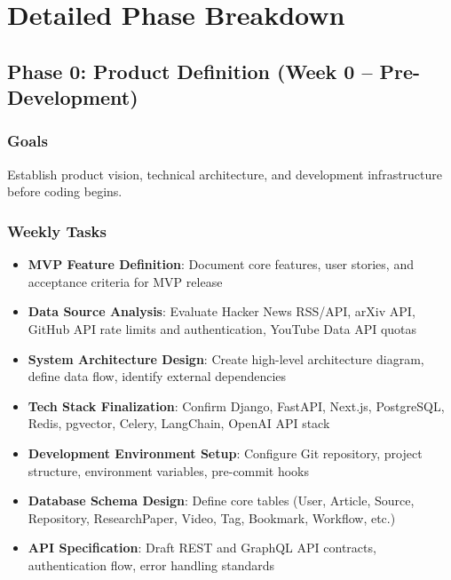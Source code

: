 \documentclass[12pt,oneside]{report}
\begin{document}
\chapter{Detailed Phase Breakdown}

\section{Phase 0: Product Definition (Week 0 -- Pre-Development)}

\subsection{Goals}

Establish product vision, technical architecture, and development infrastructure before coding begins.

\subsection{Weekly Tasks}

\begin{itemize}
    \item \textbf{MVP Feature Definition}: Document core features, user stories, and acceptance criteria for MVP release
    \item \textbf{Data Source Analysis}: Evaluate Hacker News RSS/API, arXiv API, GitHub API rate limits and authentication, YouTube Data API quotas
    \item \textbf{System Architecture Design}: Create high-level architecture diagram, define data flow, identify external dependencies
    \item \textbf{Tech Stack Finalization}: Confirm Django, FastAPI, Next.js, PostgreSQL, Redis, pgvector, Celery, LangChain, OpenAI API stack
    \item \textbf{Development Environment Setup}: Configure Git repository, project structure, environment variables, pre-commit hooks
    \item \textbf{Database Schema Design}: Define core tables (User, Article, Source, Repository, ResearchPaper, Video, Tag, Bookmark, Workflow, etc.)
    \item \textbf{API Specification}: Draft REST and GraphQL API contracts, authentication flow, error handling standards
\end{itemize}
\end{document}
